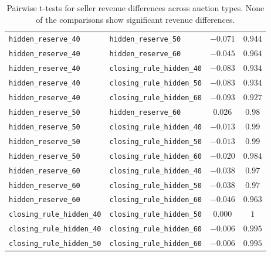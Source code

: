 \begin{table}
\begin{tabular}{l l c c}
            \texttt{hidden\_reserve\_40} & \texttt{hidden\_reserve\_50} & \(-0.071\) & \(0.944\) \\
            \texttt{hidden\_reserve\_40} & \texttt{hidden\_reserve\_60} & \(-0.045\) & \(0.964\) \\
            \texttt{hidden\_reserve\_40} & \texttt{closing\_rule\_hidden\_40} & \(-0.083\) & \(0.934\) \\
            \texttt{hidden\_reserve\_40} & \texttt{closing\_rule\_hidden\_50} & \(-0.083\) & \(0.934\) \\
            \texttt{hidden\_reserve\_40} & \texttt{closing\_rule\_hidden\_60} & \(-0.093\) & \(0.927\) \\
            \texttt{hidden\_reserve\_50} & \texttt{hidden\_reserve\_60} & \(0.026\) & \(0.98\) \\
            \texttt{hidden\_reserve\_50} & \texttt{closing\_rule\_hidden\_40} & \(-0.013\) & \(0.99\) \\
            \texttt{hidden\_reserve\_50} & \texttt{closing\_rule\_hidden\_50} & \(-0.013\) & \(0.99\) \\
            \texttt{hidden\_reserve\_50} & \texttt{closing\_rule\_hidden\_60} & \(-0.020\) & \(0.984\) \\
            \texttt{hidden\_reserve\_60} & \texttt{closing\_rule\_hidden\_40} & \(-0.038\) & \(0.97\) \\
            \texttt{hidden\_reserve\_60} & \texttt{closing\_rule\_hidden\_50} & \(-0.038\) & \(0.97\) \\
            \texttt{hidden\_reserve\_60} & \texttt{closing\_rule\_hidden\_60} & \(-0.046\) & \(0.963\) \\
            \texttt{closing\_rule\_hidden\_40} & \texttt{closing\_rule\_hidden\_50} & \(0.000\) & \(1\) \\
            \texttt{closing\_rule\_hidden\_40} & \texttt{closing\_rule\_hidden\_60} & \(-0.006\) & \(0.995\) \\
            \texttt{closing\_rule\_hidden\_50} & \texttt{closing\_rule\_hidden\_60} & \(-0.006\) & \(0.995\) \\
            \bottomrule
        \end{tabular}
            \caption{Pairwise t-tests for seller revenue differences across auction types. None of the comparisons show significant revenue differences.       \label{tab:revenue_tests}}
    \end{table}






